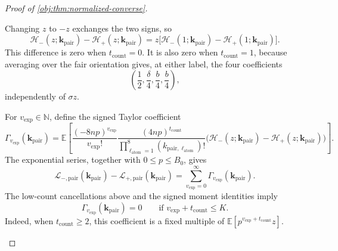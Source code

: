 \documentclass[11pt]{article}
\begin{document}
\begin{proof}[Proof of \cref{obj:thm:normalized-converse}]
\begin{enumerate}
Changing \(z\) to \(-z\) exchanges the two signs, so
\[
\mathcal H_-(z;\boldsymbol{k}_{\mathrm{pair}})
-\mathcal H_+(z;\boldsymbol{k}_{\mathrm{pair}})
=
z\bigl[
\mathcal H_-(1;\boldsymbol{k}_{\mathrm{pair}})
-\mathcal H_+(1;\boldsymbol{k}_{\mathrm{pair}})
\bigr].
\]
This difference is zero when \(t_{\mathrm{count}}=0\). It is also zero when
\(t_{\mathrm{count}}=1\), because averaging over the fair orientation gives, at either label, the four coefficients
\[
\left(\frac12,\frac\delta4,\frac b4,\frac b4\right),
\]
independently of \(\sigma z\).

For \(v_{\mathrm{exp}}\in\mathbb N\), define the signed Taylor coefficient
\[
\Gamma_{v_{\mathrm{exp}}}
(\boldsymbol{k}_{\mathrm{pair}})
=
\mathbb E\!\left[
\frac{(-8np)^{v_{\mathrm{exp}}}}{v_{\mathrm{exp}}!}
\frac{(4np)^{t_{\mathrm{count}}}}
     {\prod_{\ell_{\mathrm{atom}}=1}^{8}
       (k_{\mathrm{pair},\ell_{\mathrm{atom}}})!}
\bigl(\mathcal H_-(z;\boldsymbol{k}_{\mathrm{pair}})
-\mathcal H_+(z;\boldsymbol{k}_{\mathrm{pair}})\bigr)
\right].
\]
The exponential series, together with \(0\le p\le B_0\), gives
\[
\mathcal L_{-,\mathrm{pair}}(\boldsymbol{k}_{\mathrm{pair}})
-\mathcal L_{+,\mathrm{pair}}(\boldsymbol{k}_{\mathrm{pair}})
=
\sum_{v_{\mathrm{exp}}=0}^{\infty}
\Gamma_{v_{\mathrm{exp}}}(\boldsymbol{k}_{\mathrm{pair}}).
\]
The low-count cancellations above and the signed moment identities imply
\[
\Gamma_{v_{\mathrm{exp}}}(\boldsymbol{k}_{\mathrm{pair}})=0
\qquad
\text{if }v_{\mathrm{exp}}+t_{\mathrm{count}}\le K.
\]
Indeed, when \(t_{\mathrm{count}}\ge2\), this coefficient is a fixed multiple of
\(\mathbb E[p^{v_{\mathrm{exp}}+t_{\mathrm{count}}}z]\).


\end{enumerate}
\end{proof}
\end{document}
